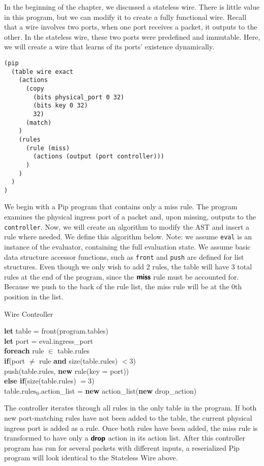 In the beginning of the chapter, we discussed a stateless wire. There is little value in this program, but we can modify it to create a fully functional wire. Recall that a wire involves two ports, when one port receives a packet, it outputs to the other. In the stateless wire, these two ports were predefined and immutable. Here, we will create a wire that learns of its ports' existence dynamically.

\begin{mdframed}
\begin{verbatim}
(pip
  (table wire exact
    (actions
      (copy
        (bits physical_port 0 32)
        (bits key 0 32)
        32)
      (match)
    )
    (rules
      (rule (miss)
        (actions (output (port controller)))
      )
    )
  )
)
\end{verbatim}
\end{mdframed}
We begin with a Pip program that contains only a miss rule. The program examines the physical ingress port of a packet and, upon missing, outputs to the \texttt{controller}. Now, we will create an algorithm to modify the AST and insert a rule where needed. We define this algorithm below. Note: we assume \texttt{eval} is an instance of the evaluator, containing the full evaluation state. We assume basic data structure accessor functions, such as \texttt{front} and \texttt{push} are defined for list structures. Even though we only wish to add 2 rules, the table will have 3 total rules at the end of the program, since the $\bm{\mathsf{{miss}}}$ rule must be accounted for. Because we push to the back of the rule list, the miss rule will be at the 0th position in the list.
\begin{algorithm}
\caption{Wire Controller}
\textbf{let} table = front(program.tables)\\
\textbf{let} port = eval.ingress\_port\\
\textbf{foreach} rule $\in$ table.rules\\
\tab\textbf{if}(port $\neq$ rule \textbf{and} size(table.rules) $< 3$)\\
\tab\tab push(table.rules, \textbf{new} rule(key = port))\\
\tab\textbf{else if}(size(table.rules) $= 3$)\\
\tab\tab table.$\textrm{rules}_0$.action\_list = \textbf{new} action\_list(\textbf{new} drop\_action)
\end{algorithm}
The controller iterates through all rules in the only table in the program. If both new port-matching rules have not been added to the table, the current physical ingress port is added as a rule. Once both rules have been added, the miss rule is transformed to have only a $\bm{\mathsf{{drop}}}$ action in its action list. After this controller program has run for several packets with different inputs, a reserialized Pip program will look identical to the Stateless Wire above.
